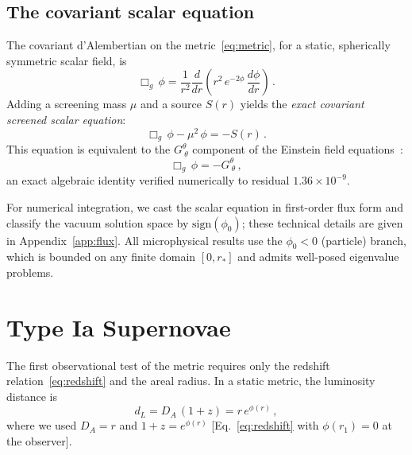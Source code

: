 \documentclass[aps,prd,twocolumn,superscriptaddress,nofootinbib,longbibliography]{revtex4-2}
\newcommand{\rstar}{r_{*}}
\newcommand{\phiz}{\phi_0}
\begin{document}
\subsection{The covariant scalar equation}

The covariant d'Alembertian on the metric~\eqref{eq:metric}, for
a static, spherically symmetric scalar field, is
\begin{equation}\label{eq:box}
  \Box_g\,\phi = \frac{1}{r^2}\frac{d}{dr}
    \!\left(r^2\,e^{-2\phi}\,\frac{d\phi}{dr}\right)\,.
\end{equation}
Adding a screening mass $\mu$ and a source $S(r)$ yields the
\emph{exact covariant screened scalar equation}:
\begin{equation}\label{eq:kg}
  \Box_g\,\phi - \mu^2\,\phi = -S(r)\,.
\end{equation}
This equation is equivalent to the $G^\theta_{\ \theta}$
component of the Einstein field equations~\cite{zenodo2025}:
\begin{equation}\label{eq:kgidentity}
  \Box_g\,\phi = -G^\theta_{\ \theta}\,,
\end{equation}
an exact algebraic identity verified numerically to residual
$1.36 \times 10^{-9}$.

For numerical integration, we cast the scalar equation in first-order
flux form and classify the vacuum solution space by
$\mathrm{sign}(\phiz)$; these technical details are given in
Appendix~\ref{app:flux}.  All microphysical results use the
$\phiz < 0$ (particle) branch, which is bounded on any finite domain
$[0, \rstar]$ and admits well-posed eigenvalue problems.

\section{Type Ia Supernovae}\label{sec:sne}

The first observational test of the metric requires only the
redshift relation~\eqref{eq:redshift} and the areal radius.  In a
static metric, the luminosity distance is
\begin{equation}\label{eq:dL}
  d_L = D_A\,(1+z) = r\,e^{\phi(r)}\,,
\end{equation}
where we used $D_A = r$ and $1+z = e^{\phi(r)}$
[Eq.~\eqref{eq:redshift} with $\phi(r_1) = 0$ at the observer].
\end{document}
